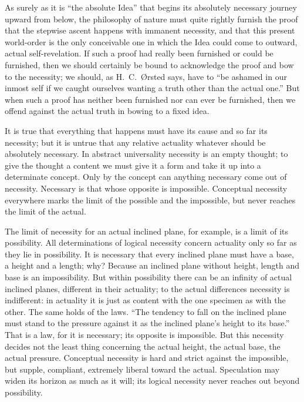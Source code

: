 \documentclass[12pt,a4paper]{book}
\begin{document}
As surely as it is ``the absolute Idea'' that begins its absolutely necessary journey upward from
below, the philosophy of nature must quite rightly furnish the proof that the stepwise ascent
happens with immanent necessity, and that this present world-order is the only conceivable one in
which the Idea could come to outward, actual self-revelation. If such a proof had really been
furnished or could be furnished, then we should certainly be bound to acknowledge the proof and
bow to the necessity; we should, as H.\ C.\ Ørsted says, have to ``be ashamed in our inmost self
if we caught ourselves wanting a truth other than the actual one.'' But when such a proof has
neither been furnished nor can ever be furnished, then we offend against the actual truth in
bowing to a fixed idea.

It is true that everything that happens must have its cause and so far its necessity; but it is
untrue that any relative actuality whatever should be absolutely necessary. In abstract
universality necessity is an empty thought; to give the thought a content we must give it a form
and take it up into a determinate concept. Only by the concept can anything necessary come out of
necessity. Necessary is that whose opposite is impossible. Conceptual necessity everywhere marks
the limit of the possible and the impossible, but never reaches the limit of the actual.

The limit of necessity for an actual inclined plane, for example, is a limit of its possibility.
All determinations of logical necessity concern actuality only so far as
they lie in possibility. It is necessary that every inclined plane must have a base, a height and
a length; why? Because an inclined plane without height, length and base is an impossibility. But
within
possibility there can be an infinity of actual inclined planes, different in their actuality; to
the actual differences necessity is indifferent: in actuality it is just as content with the one
specimen as with the other. The same holds of the laws. ``The tendency to fall on the inclined
plane must stand to the pressure against it as the inclined plane's height to its base.'' That is
a law, for it is necessary; its opposite is impossible. But this necessity decides not the least
thing concerning the actual height, the actual base, the actual pressure. Conceptual necessity is
hard and strict against the impossible, but supple, compliant, extremely liberal toward the
actual. Speculation may widen its horizon as much as it will; its logical necessity never reaches
out beyond possibility.
\end{document}
